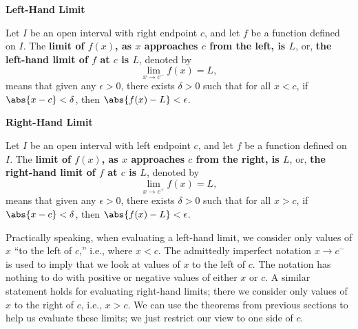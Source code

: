 \begin{definition}\label{def:onesidedlimit}%
\textbf{Left-Hand Limit} 

Let $I$ be an open interval with right endpoint $c$, and let $f$ be a function defined on $I$. %
The \textbf{limit of $f(x)$, as $x$ approaches $c$ from the left, is $L$}, or, \textbf{the left-hand limit of $f$ at $c$ is $L$}, denoted by  
\[\lim_{x\rightarrow c^-} f(x) = L,\]
means that given any $\epsilon > 0$, there exists $\delta > 0$ such that for all $x< c$,  
if  $\abs{x-c}<\delta$, then $\abs{f(x)-L}<\epsilon$.\bigskip

\textbf{Right-Hand Limit}

Let $I$ be an open interval with left endpoint $c$, and let $f$ be a function defined on $I$. %
The \textbf{limit of $f(x)$, as $x$ approaches $c$ from the right, is $L$}, or, \textbf{the right-hand limit of $f$ at $c$ is $L$}, denoted by  
\[\lim_{x\rightarrow c^+} f(x) = L,\]
means that given any $\epsilon > 0$, there exists $\delta > 0$ such that for all $x> c$,  
if  $\abs{x-c}<\delta$, then $\abs{f(x)-L}<\epsilon$.
\end{definition}

Practically speaking, when evaluating a left-hand limit, we consider only values of $x$ ``to the left of $c$,'' i.e., where $x<c$. The admittedly imperfect notation $x\to c^-$ is used to imply that we look at values of $x$ to the left of $c$. The notation has nothing to do with positive or negative values of either $x$ or $c$. A similar statement holds for evaluating right-hand limits; there we consider only values of $x$ to the right of $c$, i.e., $x>c$. We can use the theorems from previous sections to help us evaluate these limits; we just restrict our view to one side of $c$.

